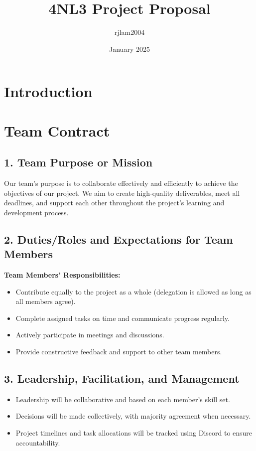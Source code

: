 \documentclass{article}
\title{4NL3 Project Proposal}
\author{rjlam2004 }
\date{January 2025}
\begin{document}
\maketitle

\section{Introduction}




\section{
     \textbf{Team Contract}
}

\vspace{0.5cm}

\subsection*{1. Team Purpose or Mission}
Our team’s purpose is to collaborate effectively and efficiently to achieve the objectives of our project. We aim to create high-quality deliverables, meet all deadlines, and support each other throughout the project's learning and development process.

\subsection*{2. Duties/Roles and Expectations for Team Members}

\textbf{Team Members’ Responsibilities:}
\begin{itemize}
    \item Contribute equally to the project as a whole (delegation is allowed as long as all members agree).
    \item Complete assigned tasks on time and communicate progress regularly.
    \item Actively participate in meetings and discussions.
    \item Provide constructive feedback and support to other team members.
\end{itemize}

\subsection*{3. Leadership, Facilitation, and Management}
\begin{itemize}
    \item Leadership will be collaborative and based on each member’s skill set.
    \item Decisions will be made collectively, with majority agreement when necessary.
    \item Project timelines and task allocations will be tracked using Discord to ensure accountability.
\end{itemize}
\end{document}
